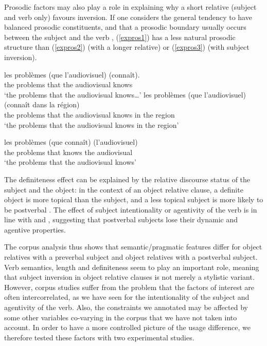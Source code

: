 \documentclass[output=paper]{langscibook}
\begin{document}
Prosodic factors may also play a role in explaining why a short relative (subject and verb only) favours inversion. If one considers the general tendency to have balanced prosodic constituents, and that a prosodic boundary usually occurs between the subject and the verb \citep{di2016}, (\ref{expros1}) has a less natural prosodic structure than (\ref{expros2}) (with a longer relative) or (\ref{expros3}) (with subject inversion).



\begin{exe}
\ex \label{expros1}

\gll les problèmes (que l’audiovisuel) (connaît).\\
the problems that {the audiovisual} knows \\    
\glt ‘the problems that the audiovisual knows…'
\ex \label{expros2}
\gll les problèmes (que l’audiovisuel) (connaît dans la région) \\
the problems that {the audiovisual} knows in the region \\    
\glt ‘the problems that the audiovisual knows in the region’

\ex \label{expros3}
\gll les problèmes (que connaît) (l’audiovisuel) \\
the problems that knows {the audiovisual}\\    
\glt‘the problems that the audiovisual knows’
\end{exe}


The definiteness effect can be explained by the relative discourse
status of the subject and the object: in the context of an object
relative clause, a definite object is more topical than the subject,
and a less topical subject is more likely to be postverbal
\citep{kampers2004}. The effect of subject intentionality or
agentivity of the verb is in line with \citet{marandin2011} and
\citet{Bonami}, suggesting that postverbal subjects lose their dynamic
and agentive properties.

The corpus analysis thus shows that semantic/pragmatic features differ
for object relatives with a preverbal subject and object relatives
with a postverbal subject. Verb semantics, length and definiteness
seem to play an important role, meaning that subject inversion in
object relative clauses is not merely a stylistic variant. However,
corpus studies suffer from the problem that the factors of interest
are often intercorrelated, as we have seen for the intentionality of
the subject and agentivity of the verb. Also, the constraints we
annotated may be affected by some other variables co-varying in the
corpus that we have not taken into account. In order to have a more
controlled picture of the usage difference, we therefore tested these
factors with two experimental studies.
\end{document}
